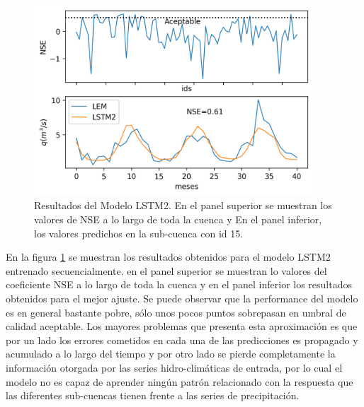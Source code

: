  
\begin{figure}[h!]
\begin{center}
  \includegraphics[height=2.8in]{Figures/seq/results_seq.png}

  \caption{ Resultados del Modelo LSTM2. En el panel superior se muestran los valores de NSE a lo largo de toda la cuenca y En
  el panel inferior, los valores predichos en la sub-cuenca con id 15. }
  \label{seq15}
\end{center}
\end{figure}

En la figura \ref{seq15} se muestran los resultados obtenidos para el modelo LSTM2 entrenado secuencialmente. 
en el panel superior se muestran lo valores del coeficiente NSE a lo largo de toda la cuenca
y en el panel inferior los resultados obtenidos para el mejor ajuste. Se puede observar que
la performance del modelo es en general bastante pobre, sólo unos pocos puntos sobrepasan en umbral de calidad aceptable.
Los mayores problemas que presenta esta aproximación es que por un lado los errores cometidos en cada una de las
predicciones es propagado y acumulado a lo largo del tiempo y por otro lado se pierde completamente
la información otorgada por las series hidro-climáticas de entrada, por lo cual el modelo no es capaz de aprender ningún 
patrón relacionado con la respuesta que las diferentes sub-cuencas tienen frente a las series de precipitación.  









